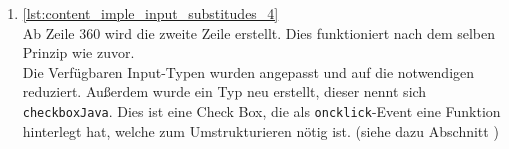 \begin{enumerate}
	\item \autoref{lst:content_imple_input_substitudes_4}\\
	Ab Zeile 360 wird die zweite Zeile erstellt. Dies funktioniert nach dem selben Prinzip wie zuvor.\\
	Die Verfügbaren Input-Typen wurden angepasst und auf die notwendigen reduziert. Außerdem wurde ein Typ neu erstellt, dieser nennt sich \texttt{checkboxJava}. Dies ist eine Check Box, die als \texttt{oncklick}-Event eine Funktion hinterlegt hat, welche zum Umstrukturieren nötig ist. (siehe dazu Abschnitt )	
	
	
\end{enumerate}
